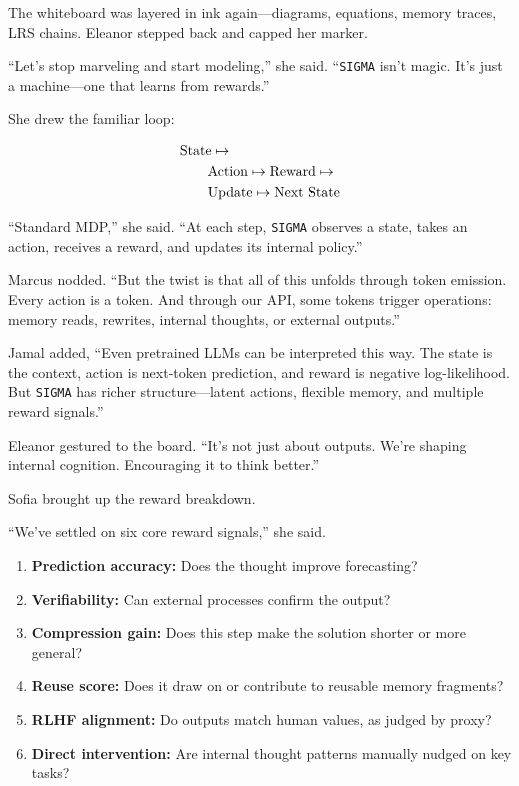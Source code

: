 \documentclass[12pt,oneside]{book}
\begin{document}
The whiteboard was layered in ink again—diagrams, equations, memory traces, LRS chains. Eleanor stepped back and capped her marker.

``Let’s stop marveling and start modeling,'' she said. ``\texttt{SIGMA} isn’t magic. It’s just a machine—one that learns from rewards.''

She drew the familiar loop:

\begin{align*}
&\rm{State} \mapsto\\
&\qquad \rm{Action} \mapsto \rm{Reward} \mapsto\\
&\qquad \rm{Update} \mapsto \rm{Next\ State}
\end{align*}

``Standard MDP,'' she said. ``At each step, \texttt{SIGMA} observes a state, takes an action, receives a reward, and updates its internal policy.''

Marcus nodded. ``But the twist is that all of this unfolds through token emission. Every action is a token. And through our API, some tokens trigger operations: memory reads, rewrites, internal thoughts, or external outputs.''

Jamal added, ``Even pretrained LLMs can be interpreted this way. The state is the context, action is next-token prediction, and reward is negative log-likelihood. But \texttt{SIGMA} has richer structure—latent actions, flexible memory, and multiple reward signals.''

Eleanor gestured to the board. ``It’s not just about outputs. We’re shaping internal cognition. Encouraging it to think better.''

Sofia brought up the reward breakdown.

``We’ve settled on six core reward signals,'' she said.

\begin{enumerate}
\item \textbf{Prediction accuracy:} Does the thought improve forecasting?
\item \textbf{Verifiability:} Can external processes confirm the output?
\item \textbf{Compression gain:} Does this step make the solution shorter or more general?
\item \textbf{Reuse score:} Does it draw on or contribute to reusable memory fragments?
\item \textbf{RLHF alignment:} Do outputs match human values, as judged by proxy?
\item \textbf{Direct intervention:} Are internal thought patterns manually nudged on key tasks?
\end{enumerate}
\end{document}
